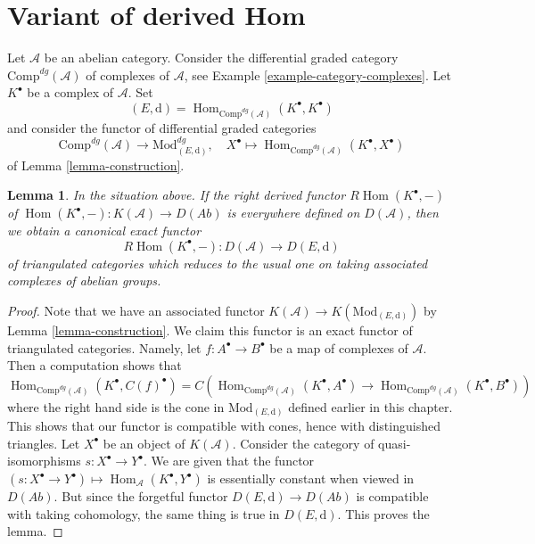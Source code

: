 \documentclass{stacks-project}
\theoremstyle{plain}
\newtheorem{lemma}[subsection]{Lemma}
\theoremstyle{definition}
\theoremstyle{remark}
\numberwithin{equation}{subsection}
\def\Hom{\mathop{\mathrm{Hom}}\nolimits}
\begin{document}
\section{Variant of derived Hom}
\label{section-variant}

\noindent
Let $\mathcal{A}$ be an abelian category. Consider the differential graded
category $\text{Comp}^{dg}(\mathcal{A})$ of complexes of $\mathcal{A}$, see
Example \ref{example-category-complexes}.
Let $K^\bullet$ be a complex of $\mathcal{A}$. Set
$$
(E, \text{d}) = \Hom_{\text{Comp}^{dg}(\mathcal{A})}(K^\bullet, K^\bullet)
$$
and consider the functor of differential graded categories
$$
\text{Comp}^{dg}(\mathcal{A}) \longrightarrow \text{Mod}^{dg}_{(E, \text{d})},
\quad
X^\bullet
\longmapsto
\Hom_{\text{Comp}^{dg}(\mathcal{A})}(K^\bullet, X^\bullet)
$$
of Lemma \ref{lemma-construction}.

\begin{lemma}
\label{lemma-existence-of-derived}
In the situation above. If the right derived functor $R\Hom(K^\bullet, -)$
of $\Hom(K^\bullet, -) : K(\mathcal{A}) \to D(\textit{Ab})$
is everywhere defined on $D(\mathcal{A})$, then we obtain a canonical exact
functor
$$
R\Hom(K^\bullet, -) : D(\mathcal{A}) \longrightarrow D(E, \text{d})
$$
of triangulated categories which reduces to the usual one  on taking
associated complexes of abelian groups.
\end{lemma}

\begin{proof}
Note that we have an associated functor
$K(\mathcal{A}) \to K(\text{Mod}_{(E, \text{d})})$ by
Lemma \ref{lemma-construction}.
We claim this functor is an exact functor of triangulated categories.
Namely, let $f : A^\bullet \to B^\bullet$ be a map of complexes
of $\mathcal{A}$. Then a computation shows that
$$
\Hom_{\text{Comp}^{dg}(\mathcal{A})}(K^\bullet, C(f)^\bullet)
=
C\left(
\Hom_{\text{Comp}^{dg}(\mathcal{A})}(K^\bullet, A^\bullet) \to
\Hom_{\text{Comp}^{dg}(\mathcal{A})}(K^\bullet, B^\bullet)
\right)
$$
where the right hand side is the cone in $\text{Mod}_{(E, \text{d})}$
defined earlier in this chapter.
This shows that our functor is compatible with cones, hence with
distinguished triangles. Let $X^\bullet$ be an object of $K(\mathcal{A})$.
Consider the category of quasi-isomorphisms $s : X^\bullet \to Y^\bullet$.
We are given that the functor
$(s : X^\bullet \to Y^\bullet) \mapsto \Hom_\mathcal{A}(K^\bullet, Y^\bullet)$
is essentially constant when viewed in $D(\textit{Ab})$.
But since the forgetful functor $D(E, \text{d}) \to D(\textit{Ab})$
is compatible with taking cohomology, the same thing is true in
$D(E, \text{d})$. This proves the lemma.
\end{proof}
\end{document}

